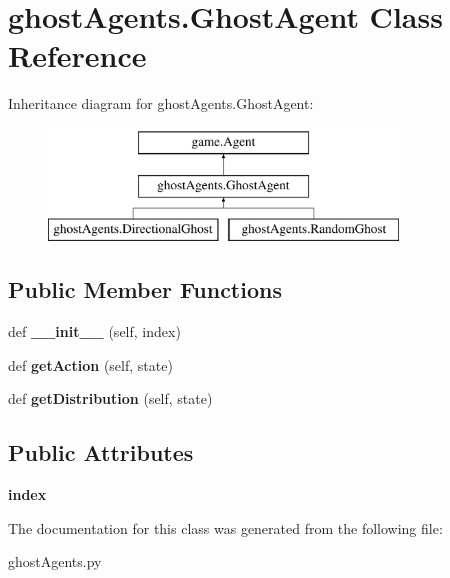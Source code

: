 \hypertarget{classghost_agents_1_1_ghost_agent}{}\section{ghost\+Agents.\+Ghost\+Agent Class Reference}
\label{classghost_agents_1_1_ghost_agent}
Inheritance diagram for ghost\+Agents.\+Ghost\+Agent\+:\begin{figure}[H]
\begin{center}
\leavevmode
\includegraphics[height=3.000000cm]{classghost_agents_1_1_ghost_agent}
\end{center}
\end{figure}
\subsection*{Public Member Functions}
\begin{DoxyCompactItemize}
\item 
\mbox{\label{classghost_agents_1_1_ghost_agent_a310fa4e78fec0b7667ff6bcbcc54ad1e}} 
def {\bfseries \+\_\+\+\_\+init\+\_\+\+\_\+} (self, index)
\item 
\mbox{\label{classghost_agents_1_1_ghost_agent_a2139653922c8efd6599b9c53b6ef0d9a}} 
def {\bfseries get\+Action} (self, state)
\item 
\mbox{\label{classghost_agents_1_1_ghost_agent_afb68eca205c88f32a9ec80e5f0c7adb3}} 
def {\bfseries get\+Distribution} (self, state)
\end{DoxyCompactItemize}
\subsection*{Public Attributes}
\begin{DoxyCompactItemize}
\item 
\mbox{\label{classghost_agents_1_1_ghost_agent_a13192b8c0890659fd738af2c02cfd04c}} 
{\bfseries index}
\end{DoxyCompactItemize}


The documentation for this class was generated from the following file\+:\begin{DoxyCompactItemize}
\item 
ghost\+Agents.\+py\end{DoxyCompactItemize}
